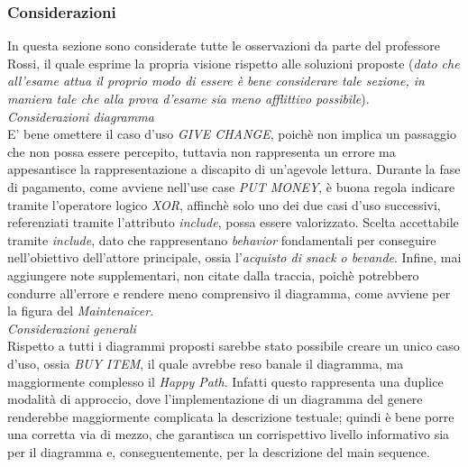 \documentclass{article}
\begin{document}
\subsubsection*{Considerazioni}
In questa sezione sono considerate tutte le osservazioni da parte del professore Rossi, il quale esprime la propria visione rispetto
alle soluzioni proposte (\textit{dato che all'esame attua il proprio modo di essere è bene considerare tale sezione, in maniera tale che alla prova d'esame sia meno afflittivo possibile}).\vspace*{14pt}\\
\textit{Considerazioni diagramma}\\
E' bene omettere il caso d'uso \textit{GIVE CHANGE}, poichè non implica un passaggio che non possa essere percepito, tuttavia non rappresenta un errore ma appesantisce la rappresentazione a discapito di un'agevole lettura.
Durante la fase di pagamento, come avviene nell'use case \textit{PUT MONEY}, è buona regola indicare tramite l'operatore logico \textit{XOR}, affinchè solo uno dei due casi d'uso successivi, referenziati tramite l'attributo \textit{include}, possa essere valorizzato.
Scelta accettabile tramite \textit{include}, dato che rappresentano \textit{behavior} fondamentali per conseguire nell'obiettivo dell'attore principale, ossia l'\textit{acquisto di snack o bevande}. Infine, mai aggiungere note supplementari, non citate dalla traccia, poichè potrebbero condurre all'errore e rendere meno comprensivo il diagramma, come avviene per la figura del \textit{Maintenaicer}.\vspace{14pt}\\
\textit{Considerazioni generali}\\
Rispetto a tutti i diagrammi proposti sarebbe stato possibile creare un unico caso d'uso, ossia \textit{BUY ITEM}, il quale avrebbe reso banale il diagramma, ma maggiormente complesso il \textit{Happy Path}. Infatti questo rappresenta una duplice modalità di approccio, dove l'implementazione di un diagramma del genere renderebbe maggiormente complicata la descrizione testuale; quindi è bene porre una corretta via di mezzo, che garantisca un corrispettivo livello informativo sia per il diagramma e, conseguentemente, per la descrizione del main sequence.
\end{document}
